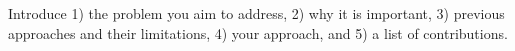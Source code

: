 Introduce 1) the problem you aim to address, 2) why it is important, 3) previous approaches and their limitations, 4) your approach, and 5) a list of contributions.

